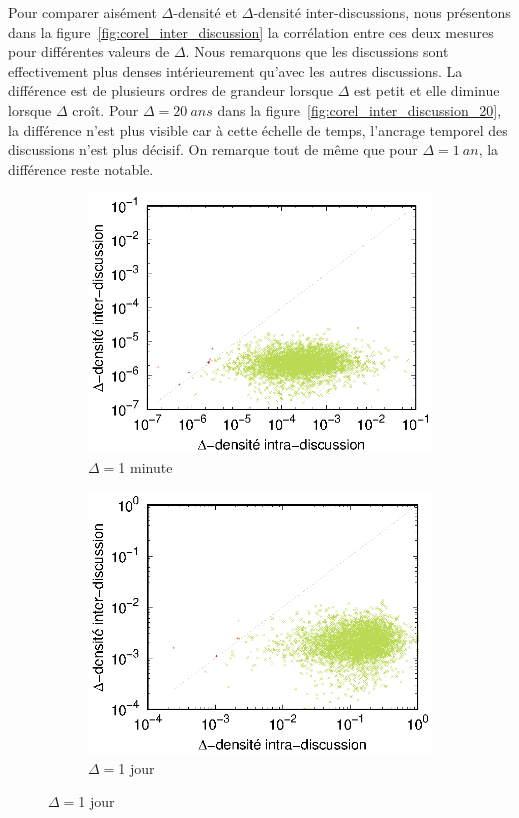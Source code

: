 Pour comparer aisément $\Delta$-densité et $\Delta$-densité inter-discussions, nous présentons dans la figure~\ref{fig:corel_inter_discussion} la corrélation entre ces deux mesures pour différentes valeurs de $\Delta$.
Nous remarquons que les discussions sont effectivement plus denses intérieurement qu'avec les autres discussions.
La différence est de plusieurs ordres de grandeur lorsque $\Delta$ est petit et elle diminue lorsque $\Delta$ croît.
Pour $\Delta=20\ ans$ dans la figure~\ref{fig:corel_inter_discussion_20}, la différence n'est plus visible car à cette échelle de temps, l'ancrage temporel des discussions n'est plus décisif.
On remarque tout de même que pour $\Delta=1\ an$, la différence reste notable.
 

\begin{figure}[h]
\centering
	\begin{subfigure}{0.4\textwidth}
		\includegraphics[width=\linewidth]{img/mailing/DensityCurve/120/mean.eps}
		\caption{$\Delta= $1 minute}		
	\end{subfigure}
	\begin{subfigure}{0.4\textwidth}
		\includegraphics[width=\linewidth]{img/mailing/DensityCurve/172800/mean.eps}
		\caption{$\Delta= $1 jour}		
	\end{subfigure}
	

\end{figure}
